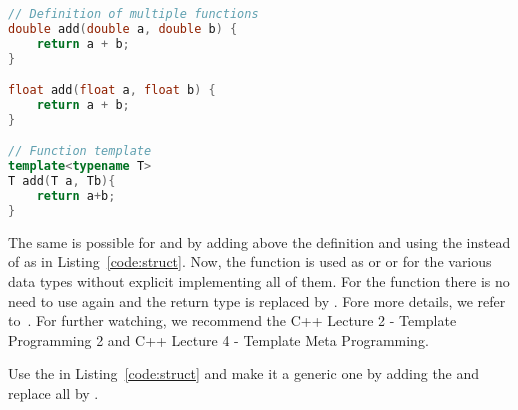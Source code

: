 \begin{lstlisting}[language=c++,caption={Example for the usage function templates.
\label{code:generix:example}},float,floatplacement=tb]
// Definition of multiple functions
double add(double a, double b) {
	return a + b;
}

float add(float a, float b) {
	return a + b;
}

// Function template
template<typename T>
T add(T a, Tb){
	return a+b;
}
\end{lstlisting}

The same is possible for  and  by adding  above the definition and using the  instead of  as in Listing~\ref{code:struct}.  Now, the function is used as  or  or  for the various data types without explicit implementing all of them. For the function  there is no need to use  again and the return type  is replaced by . Fore more details, we refer to~\cite{josuttis2003c++}. For further watching, we recommend the C++ Lecture 2 - Template Programming 2 and C++ Lecture 4 - Template Meta Programming.

\begin{exercise}
Use the  in Listing~\ref{code:struct} and make it a generic one by adding the  and replace all  by .
\end{exercise}

